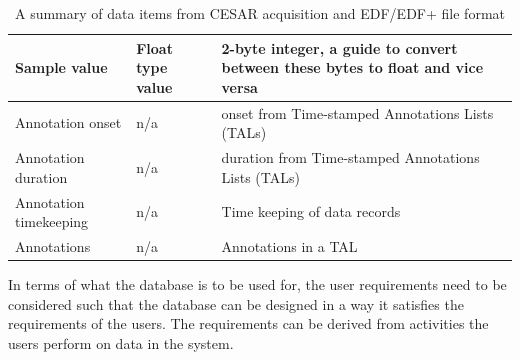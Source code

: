 \begin{table}[H]
\begin{adjustwidth}{-1.5cm}{}
\begin{center}
\begin{tabular}{ |p{5cm}||p{4.5cm}|p{5.5cm}|  }
 \hline
 Sample value& Float type value& 2-byte integer, a guide to convert between these bytes to float and vice versa\\
 \hline
 Annotation onset& n/a& onset from Time-stamped Annotations Lists (TALs)\\
 \hline
 Annotation duration& n/a& duration from Time-stamped Annotations Lists (TALs)\\
 \hline
 Annotation timekeeping& n/a& Time keeping of data records\\
 \hline
 Annotations & n/a& Annotations in a TAL\\
 \hline
\end{tabular}
\end{center}
\end{adjustwidth}
\caption{A summary of data items from CESAR acquisition and EDF/EDF+ file format}
\label{tab:Datasources}
\end{table}
In terms of what the database is to be used for, the user requirements need to be considered such that the database can be designed in a way it satisfies the requirements of the users. The requirements can be derived from activities the users perform on data in the system. 
